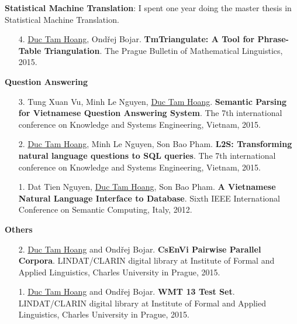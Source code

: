 \documentclass[9pt]{extreport}
\newcommand{\blankline}{\quad\pagebreak[2]}
\begin{document}
\blankline

\textbf{Statistical Machine Translation}:
I spent one year doing the master thesis in Statistical Machine Translation. 



\begin{enumerate}

\item[4.] \underline{Duc Tam Hoang}, Ond\v{r}ej Bojar. \textbf{TmTriangulate: A Tool for Phrase-Table Triangulation}. The Prague Bulletin of Mathematical Linguistics, 2015.

\end{enumerate}

\blankline

\textbf{Question Answering}
\begin{enumerate}

\item[3.] Tung Xuan Vu, Minh Le Nguyen, \underline{Duc Tam Hoang}. \textbf{Semantic Parsing for Vietnamese Question Answering System}. The 7th international conference on Knowledge and Systems Engineering, Vietnam, 2015.

\item[2.] \underline{Duc Tam Hoang}, Minh Le Nguyen, Son Bao Pham. \textbf{L2S: Transforming natural language questions to SQL queries}. The 7th international conference on Knowledge and Systems Engineering, Vietnam, 2015.

\item[1.] Dat Tien Nguyen, \underline{Duc Tam Hoang}, Son Bao Pham. \textbf{A Vietnamese Natural Language Interface to Database}. Sixth IEEE International Conference on Semantic Computing, Italy, 2012.
\end{enumerate}

\textbf{Others}
\begin{enumerate}
	
	\item[2.] \underline{Duc Tam Hoang} and  Ond\v{r}ej Bojar. \textbf{CsEnVi Pairwise Parallel Corpora}. LINDAT/CLARIN digital library at Institute of Formal and Applied Linguistics, Charles University in Prague, 2015.
	
	\item[1.] \underline{Duc Tam Hoang} and  Ond\v{r}ej Bojar. \textbf{WMT 13 Test Set}. LINDAT/CLARIN digital library at Institute of Formal and Applied Linguistics, Charles University in Prague, 2015.
\end{enumerate}






\end{document}
